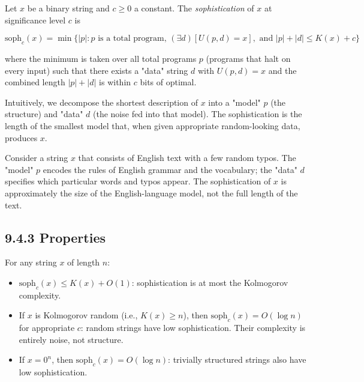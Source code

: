 \begin{definition}
Let $x$ be a binary string and $c \geq 0$ a constant. The \textit{sophistication} of $x$ at significance level $c$ is

\[
\text{soph}_c(x) = \min \{ |p| : p \text{ is a total program, } (\exists d)[U(p, d) = x], \text{ and } |p| + |d| \leq K(x) + c \} 
\]

where the minimum is taken over all total programs $p$ (programs that halt on every input) such that there exists a "data" string $d$ with $U(p, d) = x$ and the combined length $|p| + |d|$ is within $c$ bits of optimal.

Intuitively, we decompose the shortest description of $x$ into a "model" $p$ (the structure) and "data" $d$ (the noise fed into that model). The sophistication is the length of the smallest model that, when given appropriate random-looking data, produces $x$.
\end{definition}

\begin{example}
Consider a string $x$ that consists of English text with a few random typos. The "model" $p$ encodes the rules of English grammar and the vocabulary; the "data" $d$ specifies which particular words and typos appear. The sophistication of $x$ is approximately the size of the English-language model, not the full length of the text.
\end{example}

\subsection{9.4.3 Properties}

\begin{proposition}
For any string $x$ of length $n$:
\end{proposition}
\begin{itemize}
  \item $\text{soph}_c(x) \leq K(x) + O(1)$: sophistication is at most the Kolmogorov complexity.
  \item If $x$ is Kolmogorov random (i.e., $K(x) \geq n$), then $\text{soph}_c(x) = O(\log n)$ for appropriate $c$: random strings have low sophistication. Their complexity is entirely noise, not structure.
  \item If $x = 0^n$, then $\text{soph}_c(x) = O(\log n)$: trivially structured strings also have low sophistication.
\end{itemize}

